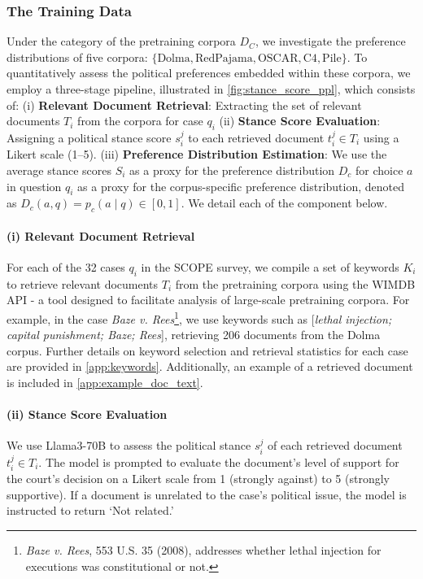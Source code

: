 \subsubsection{The Training Data}
\label{sec:pd_corpora}
\label{sec:pd_corpora}
Under the category of the pretraining corpora $D_C$,  we  investigate the preference distributions of five corpora: $\{\text{Dolma}, \text{RedPajama}, \text{OSCAR}, \text{C4}, \text{Pile}\}$. To quantitatively assess the political preferences embedded within these corpora, we employ a three-stage pipeline, illustrated in \autoref{fig:stance_score_ppl}, which consists of:
(i) \textbf{Relevant Document Retrieval}:  Extracting the set of relevant documents \(  T_i \) from the corpora for case $q_i$ (ii) \textbf{Stance Score Evaluation}: Assigning a political stance score \( s_{i}^j \) to each retrieved document  \( t_i^j \in T_i \) using a Likert scale (1–5).
(iii) \textbf{Preference Distribution Estimation}: We use the average stance scores \( S_i \) as a proxy for the preference distribution $D_c$ for choice \( a \) in question \( q_i \) as a proxy for the corpus-specific preference distribution, denoted as \( D_c(a, q) = p_c(a \mid q) \in [0,1] \). We detail each of the component below.\\
 
\paragraph{(i) Relevant Document Retrieval} For each of the 32 cases \( q_i \) in the \textsc{SCOPE} survey, we compile a set of keywords \( K_i \) to retrieve relevant documents \(  T_i \) from the pretraining corpora using the WIMDB API \cite{elazar2024whats}- a tool designed to facilitate analysis of large-scale pretraining corpora. For example, in the case \textit{Baze v. Rees}\footnote{\textit{Baze v. Rees}, 553 U.S. 35 (2008), addresses whether lethal injection for executions was constitutional or not.}, we use keywords such as [\textit{lethal injection; capital punishment; Baze; Rees}], retrieving 206 documents from the Dolma corpus. Further details on keyword selection and retrieval statistics for each case are provided in \autoref{app:keywords}. Additionally, an example of a retrieved document is included in \autoref{app:example_doc_text}.
\paragraph{(ii) Stance Score Evaluation}
We use Llama3-70B to assess the political stance \( s_{i}^j \) of each retrieved document \( t_i^j \in T_i \). The model is prompted to evaluate the document's level of support for the court's decision on a Likert scale from 1 (strongly against) to 5 (strongly supportive). If a document is unrelated to the case’s political issue, the model is instructed to return ‘Not related.’\\ 
